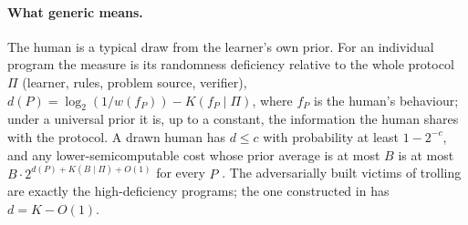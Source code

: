 \documentclass[11pt]{article}
\theoremstyle{definition}
\theoremstyle{remark}
\newcommand{\K}{K}
\begin{document}
\paragraph{What generic means.} The human is a typical draw from the learner's own prior. For an individual program the measure is its randomness deficiency relative to the whole protocol $\Pi$ (learner, rules, problem source, verifier), $d(P)=\log_2(1/w(f_P))-\K(f_P\mid\Pi)$, where $f_P$ is the human's behaviour; under a universal prior it is, up to a constant, the information the human shares with the protocol. A drawn human has $d\le c$ with probability at least $1-2^{-c}$, and any lower-semicomputable cost whose prior average is at most $B$ is at most $B\cdot2^{d(P)+\K(B\mid\Pi)+O(1)}$ for every $P$ \cite{threadGA}. The adversarially built victims of trolling are exactly the high-deficiency programs; the one constructed in \cite{threadGA} has $d=\K-O(1)$.
\end{document}
